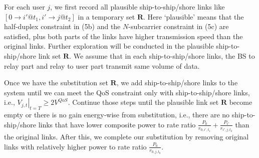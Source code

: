 \documentclass[conference]{IEEEtran}
\begin{document}
 For each user $j$, we first record all plausible ship-to-ship/shore links like $\left[ {0 \to i'@{t_1},i' \to j@{t_2}} \right]$ in a temporary set $\mathbf{R}$. Here `plausible' means that the half-duplex constraint in (5b) and the $N$-subcarrier constraint in (5c) are satisfied, plus both parts of the links have higher transmission speed than the original links. Further exploration will be conducted in the plausible ship-to-ship/shore link set $\mathbf{R}$. We assume that in each ship-to-ship/shore links, the BS to relay part and relay to user part transmit same volume of data.

 Once we have the substitution set $\mathbf{R}$, we add ship-to-ship/shore links to the system until we can meet the QoS constraint only with ship-to-ship/shore links, i.e., ${\left. {{V_{j,t}}} \right|_{t = T}} \ge 2{V^{QoS}}$. Continue those steps until the plausible link set $\mathbf{R}$ become empty or there is no gain energy-wise from substitution, i.e., there are no ship-to-ship/shore links that have lower composite power to rate ratio $ {\frac{{{P_0}}}{{{r_{0,i',{t_1}}}}} + \frac{{{P_{i'}}}}{{{r_{i',j,{t_2}}}}}} $ than the original links. 
 After this, we complete our substitution by removing original links with relatively higher power to rate ratio ${\frac{P_0}{r_{0,j,{t_0}}}}$.

 
\end{document}
